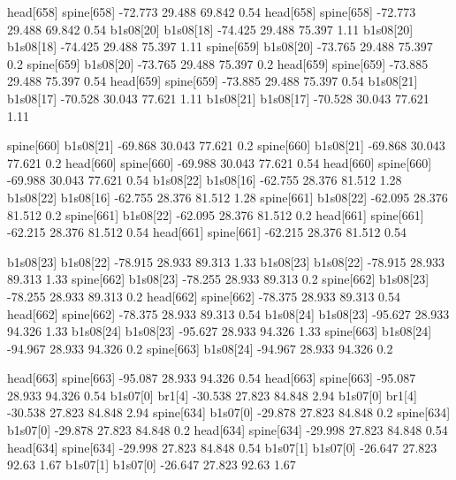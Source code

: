 head[658]    spine[658]    -72.773    29.488    69.842    0.54
head[658]    spine[658]    -72.773    29.488    69.842    0.54
b1s08[20]    b1s08[18]    -74.425    29.488    75.397    1.11
b1s08[20]    b1s08[18]    -74.425    29.488    75.397    1.11
spine[659]    b1s08[20]    -73.765    29.488    75.397    0.2
spine[659]    b1s08[20]    -73.765    29.488    75.397    0.2
head[659]    spine[659]    -73.885    29.488    75.397    0.54
head[659]    spine[659]    -73.885    29.488    75.397    0.54
b1s08[21]    b1s08[17]    -70.528    30.043    77.621    1.11
b1s08[21]    b1s08[17]    -70.528    30.043    77.621    1.11


spine[660]    b1s08[21]    -69.868    30.043    77.621    0.2
spine[660]    b1s08[21]    -69.868    30.043    77.621    0.2
head[660]    spine[660]    -69.988    30.043    77.621    0.54
head[660]    spine[660]    -69.988    30.043    77.621    0.54
b1s08[22]    b1s08[16]    -62.755    28.376    81.512    1.28
b1s08[22]    b1s08[16]    -62.755    28.376    81.512    1.28
spine[661]    b1s08[22]    -62.095    28.376    81.512    0.2
spine[661]    b1s08[22]    -62.095    28.376    81.512    0.2
head[661]    spine[661]    -62.215    28.376    81.512    0.54
head[661]    spine[661]    -62.215    28.376    81.512    0.54


b1s08[23]    b1s08[22]    -78.915    28.933    89.313    1.33
b1s08[23]    b1s08[22]    -78.915    28.933    89.313    1.33
spine[662]    b1s08[23]    -78.255    28.933    89.313    0.2
spine[662]    b1s08[23]    -78.255    28.933    89.313    0.2
head[662]    spine[662]    -78.375    28.933    89.313    0.54
head[662]    spine[662]    -78.375    28.933    89.313    0.54
b1s08[24]    b1s08[23]    -95.627    28.933    94.326    1.33
b1s08[24]    b1s08[23]    -95.627    28.933    94.326    1.33
spine[663]    b1s08[24]    -94.967    28.933    94.326    0.2
spine[663]    b1s08[24]    -94.967    28.933    94.326    0.2


head[663]    spine[663]    -95.087    28.933    94.326    0.54
head[663]    spine[663]    -95.087    28.933    94.326    0.54
b1s07[0]    br1[4]    -30.538    27.823    84.848    2.94
b1s07[0]    br1[4]    -30.538    27.823    84.848    2.94
spine[634]    b1s07[0]    -29.878    27.823    84.848    0.2
spine[634]    b1s07[0]    -29.878    27.823    84.848    0.2
head[634]    spine[634]    -29.998    27.823    84.848    0.54
head[634]    spine[634]    -29.998    27.823    84.848    0.54
b1s07[1]    b1s07[0]    -26.647    27.823    92.63    1.67
b1s07[1]    b1s07[0]    -26.647    27.823    92.63    1.67


